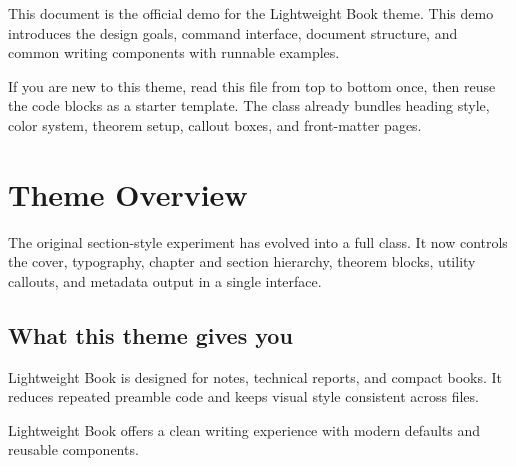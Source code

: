 \documentclass[english]{lightweightbook}
\begin{document}
    \frontmatter
    \maketitle

    \begin{bookabstract}
        This document is the official demo for the Lightweight Book theme.
        This demo introduces the design goals, command interface, document structure,
        and common writing components with runnable examples.
    \end{bookabstract}

    \begin{preface}
        If you are new to this theme, read this file from top to bottom once,
        then reuse the code blocks as a starter template. The class already bundles
        heading style, color system, theorem setup, callout boxes, and front-matter pages.
    \end{preface}

    \printbookcontents

    \mainmatter


    \chapter{Theme Overview}
    \begin{chapterquote}
        The original section-style experiment has evolved into a full class.
        It now controls the cover, typography, chapter and section hierarchy,
        theorem blocks, utility callouts, and metadata output in a single interface.
    \end{chapterquote}


    \section{What this theme gives you}
    Lightweight Book is designed for notes, technical reports, and compact books.
    It reduces repeated preamble code and keeps visual style consistent across files.

    \begin{summarybox}
        Lightweight Book offers a clean writing experience with modern defaults and reusable components.
    \end{summarybox}
\end{document}
